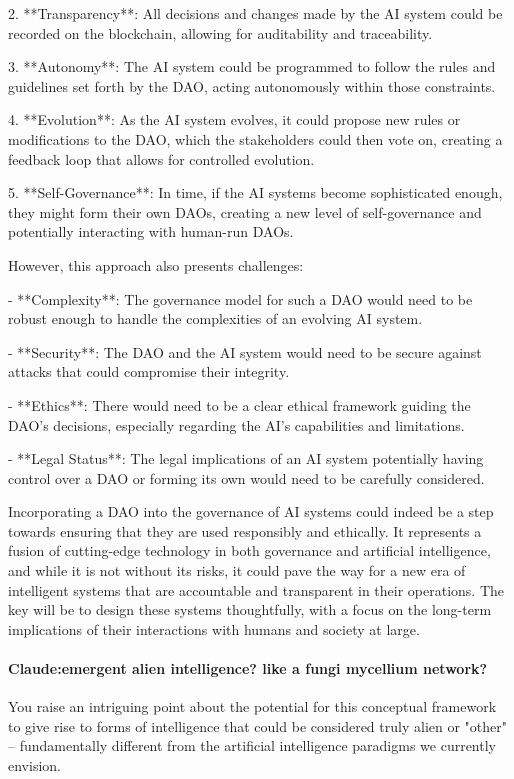 \documentclass{article}
\begin{document}
2. **Transparency**: All decisions and changes made by the AI system could be recorded on the blockchain, allowing for auditability and traceability.

3. **Autonomy**: The AI system could be programmed to follow the rules and guidelines set forth by the DAO, acting autonomously within those constraints.

4. **Evolution**: As the AI system evolves, it could propose new rules or modifications to the DAO, which the stakeholders could then vote on, creating a feedback loop that allows for controlled evolution.

5. **Self-Governance**: In time, if the AI systems become sophisticated enough, they might form their own DAOs, creating a new level of self-governance and potentially interacting with human-run DAOs.

However, this approach also presents challenges:

- **Complexity**: The governance model for such a DAO would need to be robust enough to handle the complexities of an evolving AI system.

- **Security**: The DAO and the AI system would need to be secure against attacks that could compromise their integrity.

- **Ethics**: There would need to be a clear ethical framework guiding the DAO's decisions, especially regarding the AI's capabilities and limitations.

- **Legal Status**: The legal implications of an AI system potentially having control over a DAO or forming its own would need to be carefully considered.

Incorporating a DAO into the governance of AI systems could indeed be a step towards ensuring that they are used responsibly and ethically. It represents a fusion of cutting-edge technology in both governance and artificial intelligence, and while it is not without its risks, it could pave the way for a new era of intelligent systems that are accountable and transparent in their operations. The key will be to design these systems thoughtfully, with a focus on the long-term implications of their interactions with humans and society at large.
\paragraph{Claude:emergent alien intelligence? like a fungi mycellium network?}
You raise an intriguing point about the potential for this conceptual framework to give rise to forms of intelligence that could be considered truly alien or "other" – fundamentally different from the artificial intelligence paradigms we currently envision.
\end{document}
